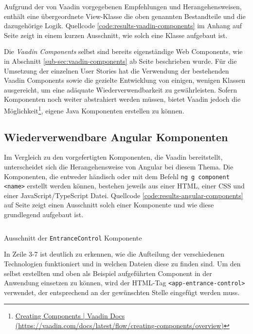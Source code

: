 \documentclass[a4paper,12pt,twoside]{scrreprt}
\begin{document}
Aufgrund der von Vaadin vorgegebenen Empfehlungen und Herangehensweisen, enthält eine übergeordnete View-Klasse die oben genannten Bestandteile und die dazugehörige Logik. Quellcode \ref{code:results-vaadin-components} im Anhang auf Seite \pageref{code:results-vaadin-components} zeigt in einem kurzen Ausschnitt, wie solch eine Klasse aufgebaut ist.

\medskip

Die \textit{Vaadin Components} selbst sind bereits eigenständige Web Components, wie in Abschnitt \ref{sub-sec:vaadin-components} ab Seite \pageref{sub-sec:vaadin-components} beschrieben wurde. Für die Umsetzung der einzelnen User Stories hat die Verwendung der bestehenden Vaadin Components sowie die gezielte Entwicklung von einigen, wenigen Klassen ausgereicht, um eine adäquate Wiederverwendbarkeit zu gewährleisten. Sofern Komponenten noch weiter abstrahiert werden müssen, bietet Vaadin jedoch die Möglichkeit\footnote{\href{https://vaadin.com/docs/latest/flow/creating-components/overview}{Creating Components | Vaadin Docs (https://vaadin.com/docs/latest/flow/creating-components/overview)}}, eigene Java Komponenten erstellen zu können.

\subsection{Wiederverwendbare Angular Komponenten}
\label{sub-sec:results-wiederverwendbarkeit-angular}
Im Vergleich zu den vorgefertigten Komponenten, die Vaadin bereitstellt, unterscheidet sich die Herangehensweise von Angular bei diesem Thema. Die Komponenten, die entweder händisch oder mit dem Befehl \texttt{ng g component <name>} erstellt werden können, bestehen jeweils aus einer HTML, einer CSS und einer JavaScript/TypeScript Datei. Quellcode \ref{code:results-angular-components} auf Seite \pageref{code:results-angular-components} zeigt einen Ausschnitt solch einer Komponente und wie diese grundlegend aufgebaut ist.

\begin{listing}[ht]
    \renewcommand{\fcolorbox}[4][]{#4}
    \inputminted[fontsize=\footnotesize,linenos,breaklines]{js}{code/Luidold_Results-Angular-Components-CodeSample.ts}
    \caption[Ausschnitt der \texttt{EntranceControl} Komponente]{Ausschnitt der \texttt{EntranceControl} Komponente}
    \label{code:results-angular-components}
\end{listing}

In Zeile 3-7 ist deutlich zu erkennen, wie die Aufteilung der verschiedenen Technologien funktioniert und in welchen Dateien diese zu finden sind. Um den selbst erstellten und oben als Beispiel aufgeführten Component in der Anwendung einsetzen zu können, wird der HTML-Tag \texttt{<app-entrance-control>} verwendet, der entsprechend an der gewünschten Stelle eingefügt werden muss.
\end{document}

